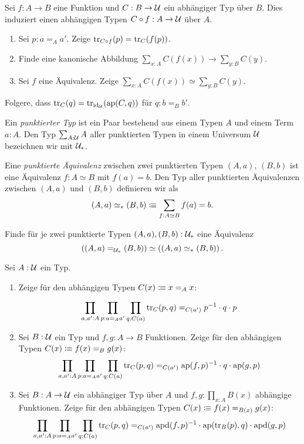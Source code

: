 \documentclass{uebung}
\begin{document}

\begin{exercise}
  Sei $f:A \to B$ eine Funktion und $C : B \to \mathcal{U}$ ein abhängiger Typ über $B$.
  Dies induziert einen abhängigen Typen $C \circ f : A \to \mathcal{U}$ über $A$.
  \begin{enumerate}
    \item Sei $p:a=_A a'$. 
      Zeige $\mathrm{tr}_{C\circ f}(p) = \mathrm{tr}_C (f(p))$.
    \item Finde eine kanonische Abbildung $\sum_{x:A} C(f(x)) \to \sum_{y:B} C(y)$.
    \item Sei $f$ eine Äquivalenz.
      Zeige $\sum_{x:A} C(f(x)) \simeq \sum_{y:B} C(y)$.
  \end{enumerate}
  Folgere, dass $\mathrm{tr}_C(q) = \mathrm{tr}_{\mathrm{id}_{\mathcal{U}}}(\mathrm{ap}(C,q))$ für $q:b =_B b'$.
\end{exercise}

\begin{exercise}
  Ein \emph{punktierter Typ} ist ein Paar bestehend aus einem Typen $A$ und einem Term $a:A$.
  Den Typ $\sum_{A:\mathcal{U}}A$ aller punktierten Typen in einem Universum $\mathcal{U}$ bezeichnen wir mit $\mathcal{U}_*$.

  Eine \emph{punktierte Äquivalenz} zwischen zwei punktierten Typen $(A,a)$, $(B,b)$ ist eine Äquivalenz $f:A\simeq B$ mit $f(a)=b$.
  Den Typ aller punktierten Äquivalenzen zwischen $(A,a)$ und $(B,b)$ definieren wir als
  $$
  (A,a) \simeq_* (B,b) \vcentcolon\mspace{-1.2mu}\equiv \sum_{f:A\simeq B} f(a) = b.
  $$

  Finde für je zwei punktierte Typen $(A,a), (B,b) : \mathcal{U}_*$ eine Äquivalenz
  $$
  \left((A,a) =_{\mathcal{U}_*} (B,b)\right) \simeq \left((A,a) \simeq_* (B,b)\right).
  $$
\end{exercise}

\begin{exercise}
  Sei $A:\mathcal{U}$ ein Typ.
  \begin{enumerate}
    \item Zeige für den abhängigen Typen $C(x)\vcentcolon\mspace{-1.2mu}\equiv x =_A x$:

      $$
      \prod_{a,a':A}\prod_{p:a =_A a'} \prod_{q:C(a)} \mathrm{tr}_C (p,q) =_{C(a')} p^{-1} \cdot q \cdot p
      $$
    \item Sei $B:\mathcal{U}$ ein Typ und $f,g : A \to B$ Funktionen.
      Zeige für den abhängigen Typen $C(x) \vcentcolon\mspace{-1.2mu}\equiv f(x)=_{B} g(x)$:
      $$
      \prod_{a,a':A}\prod_{p:a =_A a'} \prod_{q:C(a)} \mathrm{tr}_C (p,q) =_{C(a')} \mathrm{ap}(f,p)^{-1} \cdot q \cdot \mathrm{ap}(g,p)
      $$
    \item Sei $B:A \to \mathcal{U}$ ein abhängiger Typ über $A$ und $f,g:\prod_{x:A} B(x)$ abhängige Funktionen.
      Zeige für den abhängigen Typen $C(x) \vcentcolon\mspace{-1.2mu}\equiv f(x)=_{B(x)} g(x)$:
      $$
      \prod_{a,a':A}\prod_{p:a =_A a'} \prod_{q:C(a)} \mathrm{tr}_C (p,q) =_{C(a')} \mathrm{apd}(f,p)^{-1} \cdot \mathrm{ap}(\mathrm{tr}_B(p),q) \cdot \mathrm{apd}(g,p)
      $$
  \end{enumerate}
\end{exercise}
\end{document}
